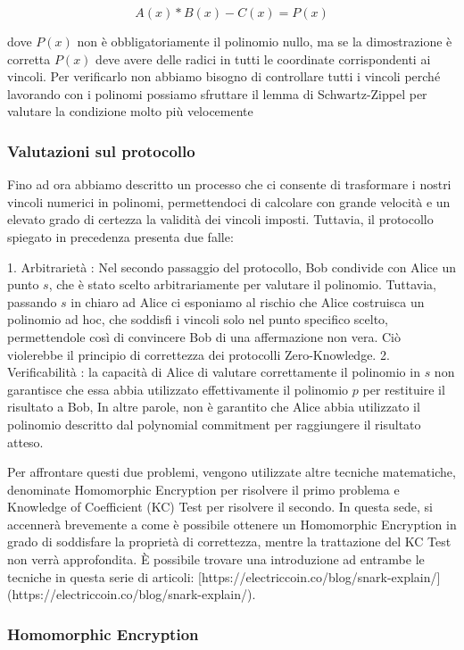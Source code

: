 $$
A(x)*B(x)-C(x)=P(x)
$$

dove $P(x)$ non è obbligatoriamente il polinomio nullo, ma se la dimostrazione è corretta $P(x)$ deve avere delle
radici in tutti le coordinate corrispondenti ai vincoli. Per verificarlo non abbiamo bisogno di controllare tutti i
vincoli perché lavorando con i polinomi possiamo sfruttare il lemma di Schwartz-Zippel per valutare la condizione
molto più velocemente
    
\subsubsection{Valutazioni sul protocollo}
Fino ad ora abbiamo descritto un processo che ci consente di trasformare i nostri vincoli numerici in polinomi,
permettendoci di calcolare con grande velocità e un elevato grado di certezza la validità dei vincoli imposti. Tuttavia,
il protocollo spiegato in precedenza presenta due falle:

1. Arbitrarietà : Nel secondo passaggio del protocollo, Bob condivide con Alice un punto $s$, che è stato scelto
arbitrariamente per valutare il polinomio. Tuttavia, passando $s$ in chiaro ad Alice ci esponiamo al rischio che Alice
costruisca un polinomio ad hoc, che soddisfi i vincoli solo nel punto specifico scelto, permettendole così di convincere
Bob di una affermazione non vera. Ciò violerebbe il principio di correttezza dei protocolli Zero-Knowledge. 2.
Verificabilità : la capacità di Alice di valutare correttamente il polinomio in $s$ non garantisce che essa abbia
utilizzato effettivamente il polinomio $p$ per restituire il risultato a Bob, In altre parole, non è garantito che Alice
abbia utilizzato il polinomio descritto dal polynomial commitment per raggiungere il risultato atteso.

Per affrontare questi due problemi, vengono utilizzate altre tecniche matematiche, denominate Homomorphic Encryption per
risolvere il primo problema e Knowledge of Coefficient (KC) Test per risolvere il secondo. In questa sede, si accennerà
brevemente a come è possibile ottenere un Homomorphic Encryption in grado di soddisfare la proprietà di correttezza,
mentre la trattazione del KC Test non verrà approfondita. È possibile trovare una introduzione ad entrambe le tecniche
in questa serie di articoli: [https://electriccoin.co/blog/snark-explain/](https://electriccoin.co/blog/snark-explain/).

\subsubsection*{Homomorphic Encryption}

